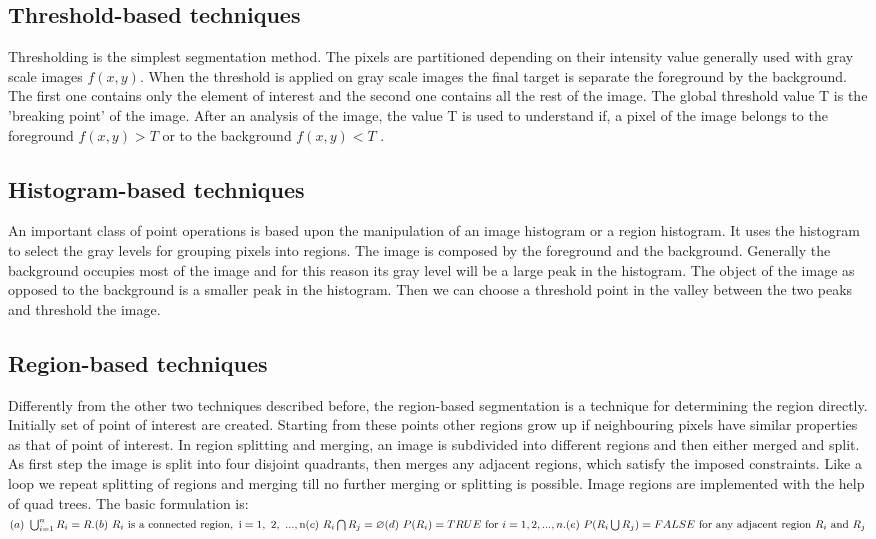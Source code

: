 \subsection{Threshold-based techniques}
Thresholding is the simplest segmentation method. The pixels are partitioned depending on their intensity value generally used with gray scale images $f(x,y)$. When the threshold is applied on gray scale images the final target is separate the foreground by the background. The first one contains only the element of interest and the second one contains all the rest of the image. The global threshold value T is the 'breaking point' of the image. After an analysis of the image, the value T is used to understand if, a pixel of the image belongs to the foreground $f(x, y) > T$ or to the background $f(x, y) < T$ .\cite{Threshold}

\subsection{Histogram-based techniques}
An important class of point operations is based upon the manipulation of an image histogram or a region histogram. It uses the histogram to select the gray levels for grouping pixels into regions. The image is composed by the foreground and the background. Generally the background occupies most of the image and for this reason its gray level will be a large peak in the histogram. The object of the image as opposed to the background is a smaller peak in the histogram. Then we can choose a threshold point in the valley between the two peaks and threshold the image.

\subsection{Region-based techniques}
Differently from the other two techniques described before, the region-based segmentation is a technique for determining the region directly. Initially set of point of interest are created. Starting from these points other regions grow up if neighbouring pixels have similar properties as that of point of interest. In region splitting and merging, an image is subdivided into different regions and then either merged and split. As first step the image is split into four disjoint quadrants, then merges any adjacent regions, which satisfy the imposed constraints. Like a loop we repeat splitting of regions and merging till no further merging or splitting is
possible. Image regions are implemented with the help of quad trees.
The basic formulation is:$\\
(a){\text{ }}\bigcup \nolimits _{{i=1}}^{{n}}{R_{{i}}=R.}\\
(b){\text{ }}R_{{i}}{\text{ is a connected region}},{\text{ i}}={\text{1}},{\text{ 2}},{\text{ }}...,{\text{n}}\\
(c){\text{ }}R_{{i}}\bigcap R_{{j}}=\varnothing\\
(d){\text{ }}P(R_{{i}})=TRUE{\text{ for }}i=1,2,...,n.\\
(e){\text{ }}P(R_{{i}}\bigcup R_{{j}})=FALSE{\text{ for any adjacent region }}R_{{i}}{\text{ and }}R_{{j}}\\
$

